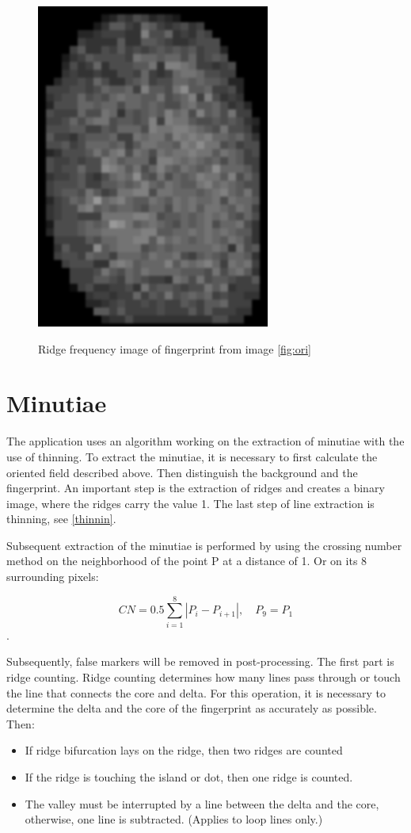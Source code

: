 \begin{figure}[H]
    \centering
        {\includegraphics[width=0.3\linewidth]{obrazky-figures/freq_navrh.png}}\\
        \caption{Ridge frequency image of fingerprint from image \ref{fig:ori}}
        \label{fig:freq_img}
\end{figure}

\section{Minutiae}
The application uses an algorithm working on the extraction of minutiae with the use of thinning. To extract the minutiae, it is necessary to first calculate the oriented field described above. Then distinguish the background and the fingerprint. An important step is the extraction of ridges and creates a binary image, where the ridges carry the value 1. The last step of line extraction is thinning, see \ref{thinnin}.

Subsequent extraction of the minutiae is performed by using the crossing number method on the neighborhood of the point P at a distance of 1. Or on its 8 surrounding pixels:\cite{thinning}

\begin{equation}
    C N=0.5 \sum_{i=1}^{8}\left|P_{i}-P_{i+1}\right|, \quad P_{9}=P_{1}
\end{equation} .

Subsequently, false markers will be removed in post-processing. The first part is ridge counting. Ridge counting determines how many lines pass through or touch the line that connects the core and delta. For this operation, it is necessary to determine the delta and the core of the fingerprint as accurately as possible. Then:

\begin{itemize}
	\item If ridge bifurcation lays on the ridge, then two ridges are counted
	\item If the ridge is touching the island or dot, then one ridge is counted.
    \item The valley must be interrupted by a line between the delta and the core, otherwise, one line is subtracted. (Applies to loop lines only.)\cite{thinning}
\end{itemize}

